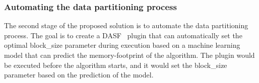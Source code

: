 \subsubsection{Automating the data partitioning process}

The second stage of the proposed solution is to automate the data partitioning process.
The goal is to create a DASF~\cite{dasf} plugin that can automatically set the optimal block\_size parameter during execution based on a machine learning model that can predict the memory-footprint of the algorithm.
The plugin would be executed before the algorithm starts, and it would set the block\_size parameter based on the prediction of the model.
